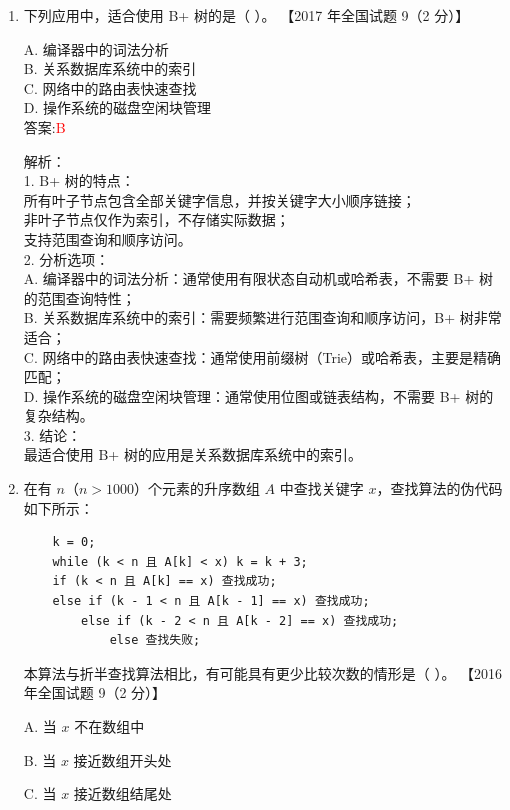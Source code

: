 \documentclass[lang=cn,newtx,10pt,scheme=chinese]{../../../elegantbook}
\begin{document}
\begin{enumerate}
\item 下列应用中，适合使用 B+ 树的是（ ）。  
    【2017 年全国试题 9（2 分）】  

    A. 编译器中的词法分析 \\  
    B. 关系数据库系统中的索引 \\  
    C. 网络中的路由表快速查找 \\  
    D. 操作系统的磁盘空闲块管理 \\  

    答案:\textcolor{red}{B}

    解析：\\
    1. B+ 树的特点：\\
        所有叶子节点包含全部关键字信息，并按关键字大小顺序链接；\\
        非叶子节点仅作为索引，不存储实际数据；\\
        支持范围查询和顺序访问。\\

    2. 分析选项：\\
        A. 编译器中的词法分析：通常使用有限状态自动机或哈希表，不需要 B+ 树的范围查询特性；\\
        B. 关系数据库系统中的索引：需要频繁进行范围查询和顺序访问，B+ 树非常适合；\\
        C. 网络中的路由表快速查找：通常使用前缀树（Trie）或哈希表，主要是精确匹配；\\
        D. 操作系统的磁盘空闲块管理：通常使用位图或链表结构，不需要 B+ 树的复杂结构。\\

    3. 结论：\\
       最适合使用 B+ 树的应用是关系数据库系统中的索引。\\
    \item 在有 $n$（$n > 1000$）个元素的升序数组 $A$ 中查找关键字 $x$，查找算法的伪代码如下所示：  
    \begin{verbatim}
    k = 0;
    while (k < n 且 A[k] < x) k = k + 3;
    if (k < n 且 A[k] == x) 查找成功;
    else if (k - 1 < n 且 A[k - 1] == x) 查找成功;
        else if (k - 2 < n 且 A[k - 2] == x) 查找成功;
            else 查找失败;
    \end{verbatim}
    本算法与折半查找算法相比，有可能具有更少比较次数的情形是（ ）。  
    【2016 年全国试题 9（2 分）】  

    A. 当 $x$ 不在数组中  

    B. 当 $x$ 接近数组开头处  

    C. 当 $x$ 接近数组结尾处 


\end{enumerate}
\end{document}
